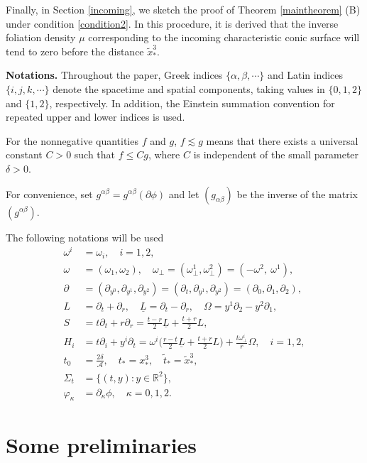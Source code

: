 \documentclass[11pt,twoside]{article}
\def\al{\alpha}
\def\p{\partial}
\begin{document}
Finally, in Section \ref{incoming}, we sketch the proof of Theorem \ref{maintheorem} (B) under condition \eqref{condition2}.
In this procedure, it is derived that
the inverse foliation density $\mu$ corresponding to the incoming characteristic conic surface
will tend to zero before the distance $\tilde {x}^3_*$.

\medskip

\textbf{Notations.}
Throughout the paper, Greek indices $\{\al, \beta, \cdots\}$ and Latin indices $\{i, j, k, \cdots\}$
denote the spacetime and spatial components, taking values in $\{0, 1, 2\}$ and $\{1, 2\}$, respectively.
In addition, the Einstein summation convention for repeated upper and lower indices is used.


For the nonnegative quantities $f$ and $g$,  $f\lesssim g$ means that there exists a universal constant $C>0$
such that $f\le Cg$, where $C$ is independent of the small parameter $\delta>0$.

For convenience, set $g^{\al\beta}=g^{\al\beta}(\p\phi)$ and let $(g_{\al\beta})$ be the inverse of the matrix $(g^{\al\beta})$.

The following notations will be used
\begin{align*}
\omega^i&=\omega_i, \quad i=1,2, \\
\omega&=(\omega_1,\omega_2), \quad \omega_\perp=(\omega_\perp^1,\omega_\perp^2)=(-\omega^2,\ \omega^1), \\
\partial&=(\partial_{y^0},\partial_{y^1},\partial_{y^2})=(\partial_t,\partial_{y^1},\partial_{y^2})=(\p_0,\p_1,\p_2), \\[2mm]
L&=\partial_t+\partial_r, \quad \underline{L} = \partial_t-\partial_r,\quad \Omega = y^1\p_2-y^2\p_1,\\[2mm]
S&=t\partial_t+r\partial_r=\frac{t- r}{2}\underline{L}+\frac{t+r}{2}L, \\[2mm]
H_i &=t\partial_{i}+y^i\partial_t=\omega^i\big(\frac{r-t}{2}\underline{L}+\frac{t+r}{2}L\big)+ \frac{t\omega^i_\perp}{r}\Omega,
\quad i=1,2, \\[2mm]
t_0 &= \frac{2\delta}{\mathcal A}, \quad t_* = x^3_*, \quad {\tilde t}_* = {\tilde  x}^3_*,\\[2mm]
\Sigma_t &= \{(t,y): y\in\mathbb R^2\}, \\[2mm]
\varphi_\kappa &= \partial_\kappa\phi, \quad \kappa=0,1,2.
\end{align*}



\section{Some preliminaries}\label{Section 2}
\end{document}
